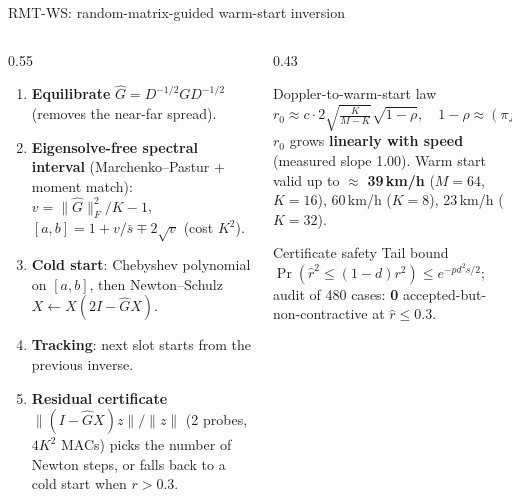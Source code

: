 \documentclass[aspectratio=169,11pt,xcolor=table]{beamer}
\begin{document}
\begin{frame}{RMT-WS: random-matrix-guided warm-start inversion}
  \footnotesize
  \begin{columns}[T]
    \begin{column}{0.55\textwidth}
      \begin{enumerate}
        \item \textbf{Equilibrate} $\hat G = D^{-1/2} G D^{-1/2}$ (removes the near-far spread).
        \item \textbf{Eigensolve-free spectral interval} (Marchenko--Pastur + moment match): $v = \|\hat G\|_F^2/K - 1$,\
          $[a,b] = 1 + v/\bar s \mp 2\sqrt v$ (cost $K^2$).
        \item \textbf{Cold start}: Chebyshev polynomial on $[a,b]$, then Newton--Schulz $X \leftarrow X(2I - \hat G X)$.
        \item \textbf{Tracking}: next slot starts from the previous inverse.
        \item \textbf{Residual certificate} $\|(I - \hat G X)z\|/\|z\|$ (2 probes, $4K^2$ MACs) picks the number of Newton steps, or falls back to a cold start when $r > 0.3$.
      \end{enumerate}
    \end{column}
    \begin{column}{0.43\textwidth}
      \begin{block}{Doppler-to-warm-start law}
        \[
          r_0 \approx c\cdot 2\sqrt{\tfrac{K}{M-K}}\sqrt{1-\rho},\quad 1-\rho \approx (\pi f_D T)^2
        \]
        $r_0$ grows \textbf{linearly with speed} (measured slope 1.00). Warm start valid up to $\approx$ \textbf{39\,km/h} ($M{=}64$, $K{=}16$), 60\,km/h ($K{=}8$), 23\,km/h ($K{=}32$).
      \end{block}
      \begin{block}{Certificate safety}
        Tail bound $\Pr(\hat r^2 \le (1-d)r^2) \le e^{-pd^2 s/2}$; audit of 480 cases: \textbf{0} accepted-but-non-contractive at $\hat r \le 0.3$.
      \end{block}
    \end{column}
  \end{columns}
\end{frame}
\end{document}
